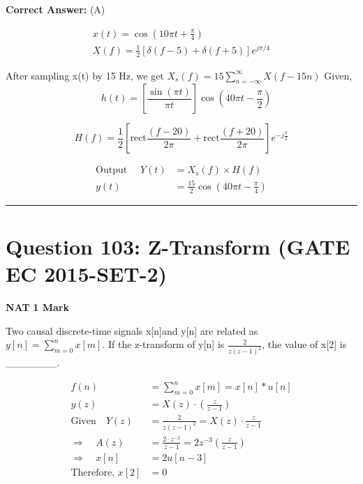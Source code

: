 \documentclass[11pt,a4paper]{article}
\begin{document}
\noindent \textbf{Correct Answer:} (A)

\begin{tcolorbox}[solbox, title=Detailed Solution -- Question 102]
\[
\begin{array}{l} x(t)=\cos \left(10 \pi t+\frac{\pi}{4}\right) \\ X(f)=\frac{1}{2}[\delta(f-5)+\delta(f+5)] e^{j \pi / 4} \end{array}
\]

 After sampling x(t) by 15 Hz, we get
$X_{s}(f)=15 \sum_{n=-\infty}^{\infty} X(f-15 n)$
 Given, 
\[
\quad h(t)=\left[\frac{\sin (\pi t)}{\pi t}\right] \cos \left(40 \pi t-\frac{\pi}{2}\right)
\]

\[
H(f)=\frac{1}{2}\left[\text{rect} \frac{(f-20)}{2 \pi}+\text{rect} \frac{(f+20)}{2 \pi}\right] e^{-j \frac{\pi}{2}}
\]

\[
\begin{aligned} \text{Output }\quad Y(t)&=X_{s}(f) \times H(f) \\ y(t)&=\frac{15}{2} \cos \left(40 \pi t-\frac{\pi}{4}\right) \end{aligned}
\]
\end{tcolorbox}

\vspace{1.5em}
\hrule
\vspace{1.5em}

\section*{Question 103: Z-Transform (GATE EC 2015-SET-2)}
\noindent \textbf{\color{primary}NAT} \hfill \textbf{\color{secondary}1 Mark}


\noindent Two causal discrete-time signals x[n]and y[n] are related as $y[n]=\sum_{m=0}^{n}x[m]$. If the z-transform of y[n] is $\frac{2}{z(z-1)^{2}}$, the value of x[2] is \_\_\_\_\_\_\_.


\begin{tcolorbox}[solbox, title=Detailed Solution -- Question 103]
\[
\begin{aligned} f(n)&=\sum_{m=0}^{n} x[m]=x[n] * u[n] \\ y(z)&=X(z) \cdot\left(\frac{z}{z-1}\right)\\ \text{Given} \quad Y(z)&=\frac{2}{z(z-1)^{2}}=X(z) \cdot \frac{z}{z-1} \\ \Rightarrow \quad A(z)&=\frac{2 \cdot z^{-2}}{z-1}=2 z^{-3}\left(\frac{z}{z-1}\right) \\ \Rightarrow \quad x[n]&=2 u[n-3] \\ \text{Therefore,  } x[2]&=0 \end{aligned}
\]
\end{tcolorbox}
\end{document}
